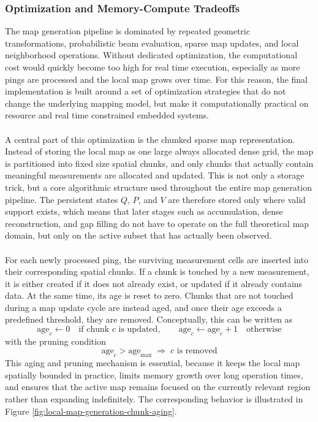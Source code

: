 \subsubsection{Optimization and Memory-Compute Tradeoffs}
The map generation pipeline is dominated by repeated geometric transformations, probabilistic beam evaluation, sparse map updates, and local neighborhood operations. Without dedicated optimization, the computational cost would quickly become too high for real time execution, especially as more pings are processed and the local map grows over time. For this reason, the final implementation is built around a set of optimization strategies that do not change the underlying mapping model, but make it computationally practical on resource and real time constrained embedded systems.
\\ \\
A central part of this optimization is the chunked sparse map representation. Instead of storing the local map as one large always allocated dense grid, the map is partitioned into fixed size spatial chunks, and only chunks that actually contain meaningful measurements are allocated and updated. This is not only a storage trick, but a core algorithmic structure used throughout the entire map generation pipeline. The persistent states $Q$, $P$, and $V$ are therefore stored only where valid support exists, which means that later stages such as accumulation, dense reconstruction, and gap filling do not have to operate on the full theoretical map domain, but only on the active subset that has actually been observed.
\\ \\
For each newly processed ping, the surviving measurement cells are inserted into their corresponding spatial chunks. If a chunk is touched by a new measurement, it is either created if it does not already exist, or updated if it already contains data. At the same time, its age is reset to zero. Chunks that are not touched during a map update cycle are instead aged, and once their age exceeds a predefined threshold, they are removed. Conceptually, this can be written as
$$
    \text{age}_c \leftarrow 0 \quad \text{if chunk } c \text{ is updated},
    \qquad
    \text{age}_c \leftarrow \text{age}_c + 1 \quad \text{otherwise}
$$
with the pruning condition
$$
    \text{age}_c > \text{age}_{\max} \;\Rightarrow\; c \text{ is removed}
$$
This aging and pruning mechanism is essential, because it keeps the local map spatially bounded in practice, limits memory growth over long operation times, and ensures that the active map remains focused on the currently relevant region rather than expanding indefinitely. The corresponding behavior is illustrated in Figure \ref{fig:local-map-generation-chunk-aging}.
